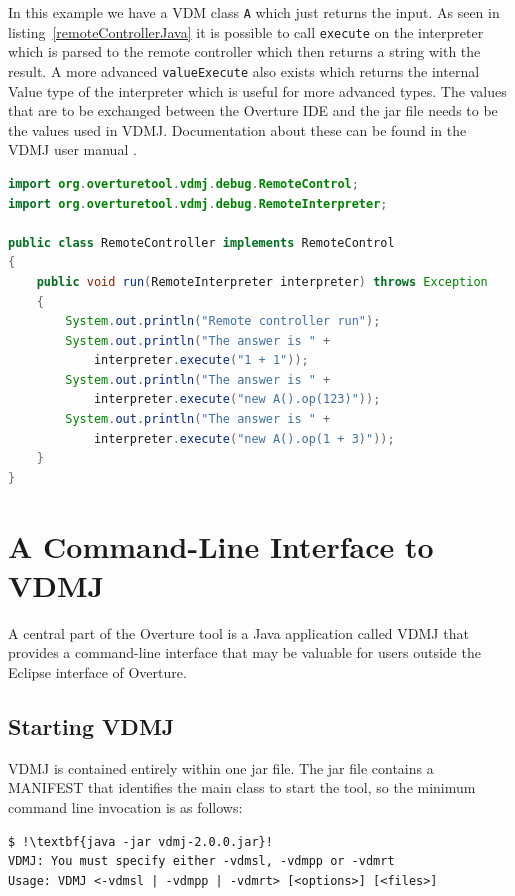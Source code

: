 \documentclass{overturerepchap}
\begin{document}
In this example we have a VDM class \texttt{A} which just returns the input. As
seen in listing~\ref{remoteControllerJava} it is possible to call
\texttt{execute} on the interpreter which is parsed to the remote
controller which then returns a string with the result. A more
advanced \texttt{valueExecute} also exists which returns the internal
Value type of the interpreter which is useful for more advanced
types. The
values that are to be exchanged between the Overture IDE and the jar
file needs to be the values used in VDMJ. Documentation about these
can be found in the VDMJ user manual \cite{Battle09}.

\begin{lstlisting}[language=JAVA,label=remoteControllerJava,caption=Remote Controller Java class,captionpos=b]
import org.overturetool.vdmj.debug.RemoteControl;
import org.overturetool.vdmj.debug.RemoteInterpreter;

public class RemoteController implements RemoteControl
{
	public void run(RemoteInterpreter interpreter) throws Exception
	{
		System.out.println("Remote controller run");
		System.out.println("The answer is " + 
			interpreter.execute("1 + 1")); 
		System.out.println("The answer is " + 
			interpreter.execute("new A().op(123)")); 
		System.out.println("The answer is " + 
			interpreter.execute("new A().op(1 + 3)")); 
	}
}
\end{lstlisting}

\chapter{A Command-Line Interface to VDMJ}\label{sec:commandline}

A central part of the Overture tool is a Java application
called VDMJ that provides a command-line interface that may be valuable
for users outside the Eclipse interface of Overture.

\section{Starting VDMJ}

VDMJ is contained entirely within one jar file. The jar
file contains a MANIFEST that identifies the main class to start the
tool, so the minimum command line invocation is as follows:

\lstset{style=tool,language=}
\begin{lstlisting}
$ !\textbf{java -jar vdmj-2.0.0.jar}!
VDMJ: You must specify either -vdmsl, -vdmpp or -vdmrt
Usage: VDMJ <-vdmsl | -vdmpp | -vdmrt> [<options>] [<files>]
\end{lstlisting}
\lstset{style=mystyle}
\lstset{language=VDM++}
\end{document}
